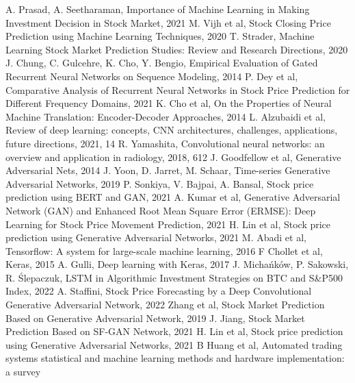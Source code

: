 \documentclass[11pt]{article} %
\begin{document}
\begin{thebibliography}{9}
A. Prasad, A. Seetharaman, Importance of Machine Learning in Making Investment Decision in Stock Market, 2021
M. Vijh et al, Stock Closing Price Prediction using Machine Learning Techniques, 2020
T. Strader, Machine Learning Stock Market Prediction Studies: Review and Research Directions, 2020
J. Chung, C. Gulcehre, K. Cho, Y. Bengio, Empirical Evaluation of Gated Recurrent Neural Networks on Sequence Modeling, 2014
P. Dey et al, Comparative Analysis of Recurrent Neural Networks in Stock Price Prediction for Different Frequency Domains, 2021 
K. Cho et al, On the Properties of Neural Machine Translation: Encoder-Decoder Approaches, 2014
L. Alzubaidi et al, Review of deep learning: concepts, CNN architectures, challenges, applications, future directions, 2021, 14
R. Yamashita, Convolutional neural networks: an overview and application in radiology, 2018, 612
J. Goodfellow et al, Generative Adversarial Nets, 2014
J. Yoon, D. Jarret, M. Schaar, Time-series Generative Adversarial Networks, 2019
P. Sonkiya, V. Bajpai, A. Bansal, Stock price prediction using BERT and GAN, 2021
A. Kumar et al, Generative Adversarial Network (GAN) and Enhanced Root Mean Square Error (ERMSE): Deep Learning for Stock Price Movement Prediction, 2021
H. Lin et al, Stock price prediction using Generative Adversarial Networks, 2021 
M. Abadi et al, Tensorflow: A system for large-scale machine learning, 2016
F Chollet et al, Keras, 2015
A. Gulli,  Deep learning with Keras, 2017
J. Michańków, P. Sakowski, R. Ślepaczuk, LSTM in Algorithmic Investment Strategies on BTC and S\&P500 Index, 2022
A. Staffini, Stock Price Forecasting by a Deep Convolutional Generative Adversarial Network, 2022
Zhang et al, Stock Market Prediction Based on Generative Adversarial Network, 2019
J. Jiang, Stock Market Prediction Based on SF-GAN Network, 2021
H. Lin et al, Stock price prediction using Generative Adversarial Networks, 2021
B Huang et al, Automated trading systems statistical and machine learning methods and hardware implementation: a survey

\end{thebibliography}
\end{document}
